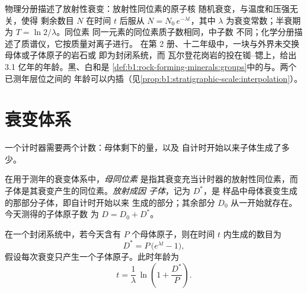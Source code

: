 \begin{recall}
物理分册描述了放射性衰变：放射性同位素的原子核
随机衰变，与温度和压强无关，使得
剩余数目 $N$ 在时间 $t$ 后服从 $N = N_0\,e^{-\lambda t}$，其中
$\lambda$ 为衰变常数；半衰期为 $T = \ln 2/\lambda$。同位素
同一元素的同位素质子数相同，中子数
不同；化学分册描述了质谱仪，它按质量对离子进行。
在第 2 册、十二年级中，一块与外界未交换母体或子体原子的岩石或
即为封闭系统，而
瓦尔登花岗岩的投在铷–锶上，给出
3.1 亿年的年龄。黑、白和是
\cref{def:b1:rock-forming-minerals:groups}中的与。两个已测年层位之间的
年龄可以内插（见\cref{prop:b1:stratigraphic-scale:interpolation}）。
\end{recall}

\section{衰变体系}\label{sec:b1:radiometric-methods:systems}

一个计时器需要两个计数：母体剩下的量，以及
自计时开始以来子体生成了多少。

\begin{definition}\label{def:b1:radiometric-methods:radiogenic}
在用于测年的衰变体系中，\emph{母同位素}
是指其衰变充当计时器的放射性同位素，而
子体是其衰变产生的同位素。\emph{放射成因
子体}，记为 $D^*$，是
样品中母体衰变生成的那部分子体，即自计时开始以来
生成的部分；其余部分 $D_0$ 从一开始就存在。今天测得的子体原子数
为 $D = D_0 + D^*$。
\end{definition}

\begin{proposition}[放射成因子体的增长与年龄方程]\label{prop:b1:radiometric-methods:growth}
在一个封闭系统中，若今天含有 $P$ 个母体原子，则在时间 $t$ 内生成的数目为
\[
  D^* = P\,\bigl(e^{\lambda t} - 1\bigr),
\]
假设每次衰变只产生一个子体原子。此时年龄为
\[
  t = \frac{1}{\lambda}\,\ln\!\left(1 + \frac{D^*}{P}\right).
\]
\end{proposition}

